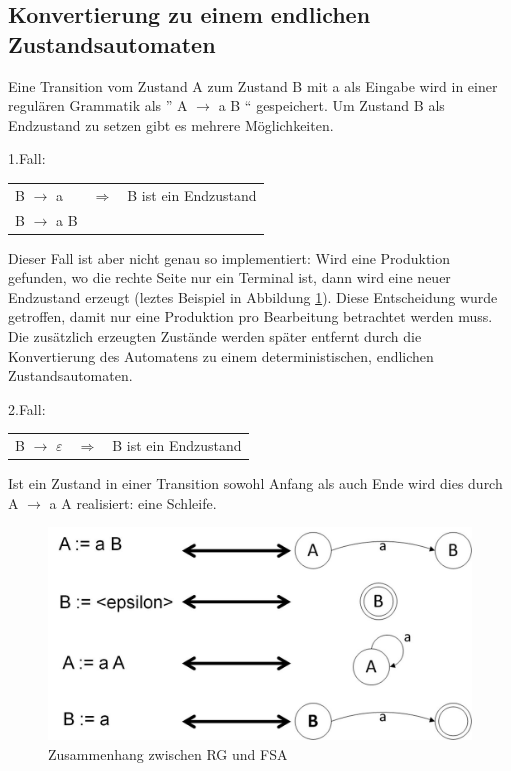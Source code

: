 \subsection{Konvertierung zu einem endlichen Zustandsautomaten}

Eine Transition vom Zustand A zum Zustand B mit a als Eingabe wird in einer
regulären Grammatik als '' A $\rightarrow$ a B `` gespeichert.
Um Zustand B als Endzustand zu setzen gibt es mehrere Möglichkeiten.

1.Fall:

\begin{tabular}{lcr}
B $\rightarrow$ a & $\Longrightarrow$ & B ist ein Endzustand\\
B $\rightarrow$ a B\\
\end{tabular}

Dieser Fall ist aber nicht genau so implementiert: Wird eine Produktion gefunden,
wo die rechte Seite nur ein Terminal ist, dann wird eine neuer Endzustand
erzeugt (leztes Beispiel in Abbildung \ref{fig:convGrammar}). Diese Entscheidung
wurde getroffen, damit nur eine Produktion pro Bearbeitung betrachtet werden
muss. Die zusätzlich erzeugten Zustände werden später entfernt durch die
Konvertierung des Automatens zu einem deterministischen, endlichen
Zustandsautomaten.

2.Fall:

\begin{tabular}{lcr}
B $\rightarrow$ $\varepsilon$ & $\Longrightarrow$ & B ist ein Endzustand\\
\end{tabular}

Ist ein Zustand in einer Transition sowohl Anfang als auch Ende wird dies durch
A $\rightarrow$ a A realisiert: eine Schleife.

\begin{figure}[h]
  \begin{center}
  \includegraphics[scale = 0.4]{objectsToInclude/convGram.jpg}
  \caption{Zusammenhang zwischen RG und FSA}
  \label{fig:convGrammar}
  \end{center}
\end{figure}

